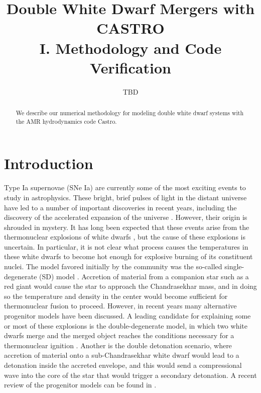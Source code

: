 \documentclass[12pt,preprint]{aastex}
\begin{document}
\title{Double White Dwarf Mergers with CASTRO\\ I. Methodology and Code 
       Verification}


\author{TBD}
\begin{abstract}
We describe our numerical methodology for modeling double white dwarf
systems with the AMR hydrodynamics code Castro.

\end{abstract}

\section{Introduction}

Type Ia supernovae (SNe Ia) are currently some of the most exciting events to study in astrophysics. These bright, brief pulses of light in the distant universe have led to a number of important discoveries in recent years, including the discovery of the accelerated expansion of the universe \citep{perlmutter1999,riess1998}. However, their origin is shrouded in mystery. It has long been expected that these events arise from the thermonuclear explosions of white dwarfs \citep{hoyle_fowler:1960}, but the cause of these explosions is uncertain. In particular, it is not clear what process causes the temperatures in these white dwarfs to become hot enough for explosive burning of its constituent nuclei. The model favored initially by the community was the so-called single-degenerate (SD) model \citep{whelan_iben:1973}. Accretion of material from a companion star such as a red giant would cause the star to approach the Chandrasekhar mass, and in doing so the temperature and density in the center would become sufficient for thermonuclear fusion to proceed. However, in recent years many alternative progenitor models have been discussed. A leading candidate for explaining some or most of these explosions is the double-degenerate model, in which two white dwarfs merge and the merged object reaches the conditions necessary for a thermonuclear ignition \citep{ibentutukov:1984,webbink:1984}. Another is the double detonation scenario, where accretion of material onto a sub-Chandrasekhar white dwarf would lead to a detonation inside the accreted envelope, and this would send a compressional wave into the core of the star that would trigger a secondary detonation. A recent review of the progenitor models can be found in \citet{hillebrandt:2013}.
\end{document}
